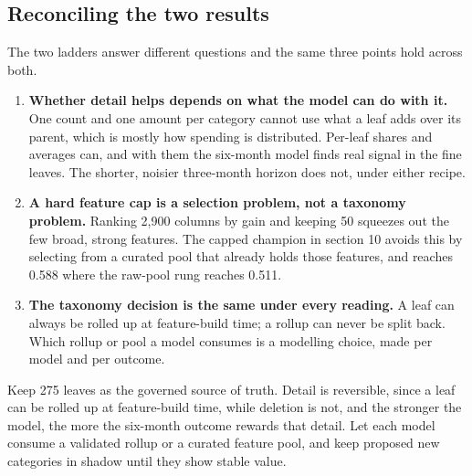 \subsection{Reconciling the two results}
The two ladders answer different questions and the same three points hold across both.

\begin{enumerate}
\item \textbf{Whether detail helps depends on what the model can do with it.} One count and one amount per category cannot use what a leaf adds over its parent, which is mostly how spending is distributed. Per-leaf shares and averages can, and with them the six-month model finds real signal in the fine leaves. The shorter, noisier three-month horizon does not, under either recipe.
\item \textbf{A hard feature cap is a selection problem, not a taxonomy problem.} Ranking 2,900 columns by gain and keeping 50 squeezes out the few broad, strong features. The capped champion in section 10 avoids this by selecting from a curated pool that already holds those features, and reaches 0.588 where the raw-pool rung reaches 0.511.
\item \textbf{The taxonomy decision is the same under every reading.} A leaf can always be rolled up at feature-build time; a rollup can never be split back. Which rollup or pool a model consumes is a modelling choice, made per model and per outcome.
\end{enumerate}
\begin{tcolorbox}[colback=BlueTint,colframe=Blue,boxrule=0pt,leftrule=2pt,arc=3mm]
Keep 275 leaves as the governed source of truth. Detail is reversible, since a leaf can be rolled up at feature-build time, while deletion is not, and the stronger the model, the more the six-month outcome rewards that detail. Let each model consume a validated rollup or a curated feature pool, and keep proposed new categories in shadow until they show stable value.
\end{tcolorbox}
